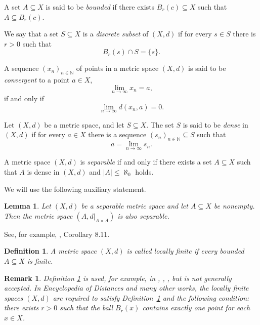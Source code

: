 \documentclass[pdflatex,sn-mathphys-num]{sn-jnl}%
\newtheorem{lemma}{Lemma}%
\newtheorem{definition}{Definition}%
\theoremstyle{thmstyletwo}%
\newtheorem{remark}{Remark}%
\begin{document}



A set $A \subseteq X$ is said to be {\it bounded} if there exists $B_r(c) \subseteq X$ such that $A \subseteq B_r(c).$

We say that a set $S \subseteq X$ is a \emph{discrete subset} of $(X, d)$ if for every $s \in S$ there is $r > 0$ such that
\begin{equation}
    B_r(s) \cap S = \{s\}.
\end{equation}




A sequence \((x_n)_{n \in \mathbb{N}}\) of points in a metric space \((X, d)\) is said to be {\it convergent} to a point \(a \in X\),
\begin{equation*}%
\lim_{n \to \infty} x_n = a,
\end{equation*}
if and only if 
\begin{equation*}%
\lim_{n \to \infty} d(x_n, a) = 0.
\end{equation*}



Let \((X, d)\) be a metric space, and let \(S \subseteq X\). The set \(S\) is said to be \emph{dense} in \((X, d)\) if for every \(a \in X\) there is a sequence \((s_n)_{n\in \mathbb{N}} \subseteq S\) such that
\[
a = \lim_{n \to \infty} s_n.
\]

 A metric space $(X, d)$ is  {\it separable} if and only if there exists a set $A \subseteq X$ 
such that $A$ is dense in $(X, d)$ and $|A| \leq \aleph_0$ holds.


We will use the following auxiliary statement.

\begin{lemma} \label{satur}
Let $ (X, d)$ be a separable metric space and let $ A \subseteq X $ be nonempty. Then the metric space $(A, d|_{A \times A})$ is also separable.
\end{lemma}

See, for example, \cite[p. 216]{Surinder}, Corollary 8.11.


\begin{definition}\label{7jgreoo}
A metric space $(X,d)$ is called \textit{locally finite} if every bounded $A\subseteq X$ is finite.
\end{definition}


\begin{remark}
Definition \ref{7jgreoo} is used, for example, in \cite{Capraro}, \cite{Ost-Ost}, \cite{Ost}, but is not generally accepted.
In Encyclopedia of Distances \cite{Dez-Dez} and many other works, the locally finite spaces $(X,d)$  are required to satisfy Definition~\ref{7jgreoo} and the following condition: there exists $r > 0$ such that the ball $B_r(x)$ contains exactly one point for each $x \in X$.
\end{remark}
\end{document}
